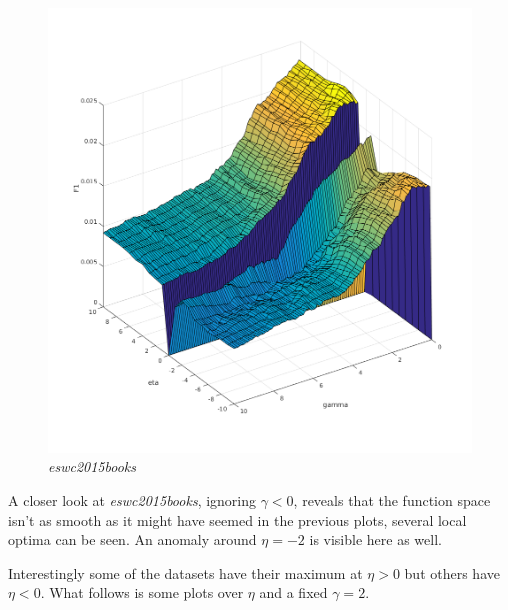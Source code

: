 \begin{figure}[h!]
    \includegraphics[width=\textwidth]{fig/link_eta_gamma/eswc2015books.png}
    \caption{\textit{eswc2015books}}
\end{figure}

\FloatBarrier

A closer look at \textit{eswc2015books}, ignoring $\gamma < 0$, reveals that the function space isn't as smooth as it might have seemed in the previous plots, several local optima can be seen. An anomaly around $\eta = -2$ is visible here as well.

\newpage

Interestingly some of the datasets have their maximum at $\eta > 0$ but others have $\eta < 0$. What follows is some plots over $\eta$ and a fixed $\gamma = 2$.

\FloatBarrier


